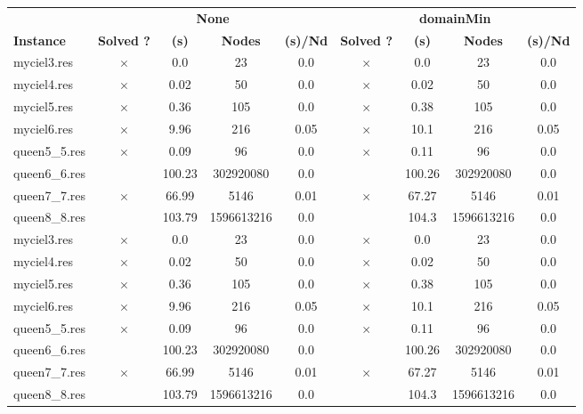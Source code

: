 \documentclass[main.tex]{subfiles}
\begin{document}
\thispagestyle{empty}

\begin{landscape}
\begin{center}
\renewcommand{\arraystretch}{1.4} 
\begin{tabular}{l
cccccccc}
	\hline
 & \multicolumn{4}{c}{\textbf{None}} & \multicolumn{4}{c}{\textbf{domainMin}}\\
\textbf{Instance}  & \textbf{Solved ?} & \textbf{(s)} & \textbf{Nodes} & \textbf{(s)/Nd} & \textbf{Solved ?} & \textbf{(s)} & \textbf{Nodes} & \textbf{(s)/Nd}\\\hline

myciel3.res & $\times$ & 0.0 & 23 & 0.0
 & $\times$ & 0.0 & 23 & 0.0
\\
myciel4.res & $\times$ & 0.02 & 50 & 0.0
 & $\times$ & 0.02 & 50 & 0.0
\\
myciel5.res & $\times$ & 0.36 & 105 & 0.0
 & $\times$ & 0.38 & 105 & 0.0
\\
myciel6.res & $\times$ & 9.96 & 216 & 0.05
 & $\times$ & 10.1 & 216 & 0.05
\\
queen5\_5.res & $\times$ & 0.09 & 96 & 0.0
 & $\times$ & 0.11 & 96 & 0.0
\\
queen6\_6.res &  & 100.23 & 302920080 & 0.0
 &  & 100.26 & 302920080 & 0.0
\\
queen7\_7.res & $\times$ & 66.99 & 5146 & 0.01
 & $\times$ & 67.27 & 5146 & 0.01
\\
queen8\_8.res &  & 103.79 & 1596613216 & 0.0
 &  & 104.3 & 1596613216 & 0.0
\\
myciel3.res & $\times$ & 0.0 & 23 & 0.0
 & $\times$ & 0.0 & 23 & 0.0
\\
myciel4.res & $\times$ & 0.02 & 50 & 0.0
 & $\times$ & 0.02 & 50 & 0.0
\\
myciel5.res & $\times$ & 0.36 & 105 & 0.0
 & $\times$ & 0.38 & 105 & 0.0
\\
myciel6.res & $\times$ & 9.96 & 216 & 0.05
 & $\times$ & 10.1 & 216 & 0.05
\\
queen5\_5.res & $\times$ & 0.09 & 96 & 0.0
 & $\times$ & 0.11 & 96 & 0.0
\\
queen6\_6.res &  & 100.23 & 302920080 & 0.0
 &  & 100.26 & 302920080 & 0.0
\\
queen7\_7.res & $\times$ & 66.99 & 5146 & 0.01
 & $\times$ & 67.27 & 5146 & 0.01
\\
queen8\_8.res &  & 103.79 & 1596613216 & 0.0
 &  & 104.3 & 1596613216 & 0.0
\\
\hline\end{tabular}
\end{center}
\end{landscape}
\end{document}
